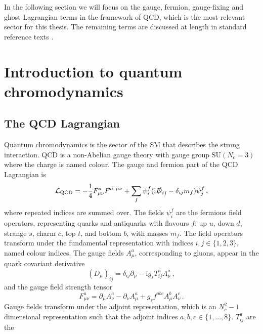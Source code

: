 \documentclass[main.tex]{subfiles}
\begin{document}
    In the following section we will focus on the gauge, fermion, gauge-fixing
    and ghost Lagrangian terms in the framework of QCD, which is the most
    relevant sector for this thesis. The remaining terms are discussed at
    length in standard reference texts \cite{Peskin:1995ev,Schwartz:2014sze,Romao:2012pq}.


\section{Introduction to quantum chromodynamics}\label{sec:qcd}
    \subsection{The QCD Lagrangian}\label{sec:L_qcd}
    Quantum chromodynamics is the sector of the SM that
    describes the strong interaction. 
    QCD is a non-Abelian gauge theory with gauge group
    $\mathrm{SU}(N_{c} = 3)$ where the charge is named colour.
    The gauge and fermion part of the QCD Lagrangian is
    \begin{equation}\label{eqn:L_QCD}
        \mathcal{L}_{\mathrm{QCD}} = -\dfrac{1}{4}F^{a}_{\mu\nu}F^{a, \, \mu\nu}
        + \sum_{f} \bar{\psi}_{i}^{f}(\mathrm{i}\slashed{D}_{ij} - \delta_{ij}m_{f})\psi_{j}^{f} \, ,
    \end{equation}
    where repeated indices are summed over.
    The fields $\psi_{i}^{f}$ are the fermions field operators,
    representing quarks and antiquarks with flavours $f$: 
    up $u$, down $d$, strange $s$, charm $c$, top $t$, and bottom $b$,
    with masses $m_{f}$. The field operators transform under the fundamental
    representation with indices $i, j \in \{1, 2, 3\}$, named colour indices.
    The gauge fields $A^{a}_{\mu}$, corresponding to gluons, 
    appear in the quark covariant derivative
    \begin{equation}\label{eqn:covariant_deriv}
        (D_{\mu})_{ij} = \delta_{ij}\partial_{\mu} - \mathrm{i}g_{s}T^{a}_{ij}A^{a}_{\mu} \, ,
    \end{equation}
    and the gauge field strength tensor
    \begin{equation}\label{eqn:F_munu}
        F^{a}_{\mu\nu} = \partial_{\mu}A^{a}_{\nu} - \partial_{\nu}A^{a}_{\mu} + g_{s} f^{abc}A^{b}_{\mu}A^{c}_{\nu} \, .
    \end{equation}
    Gauge fields transform under the adjoint representation, 
    which is an $N_{c}^{2}-1$ dimensional representation such that
    the adjoint indices $a,b,c \in \{1,...,8\}$. $T^{a}_{ij}$ are the
\end{document}
